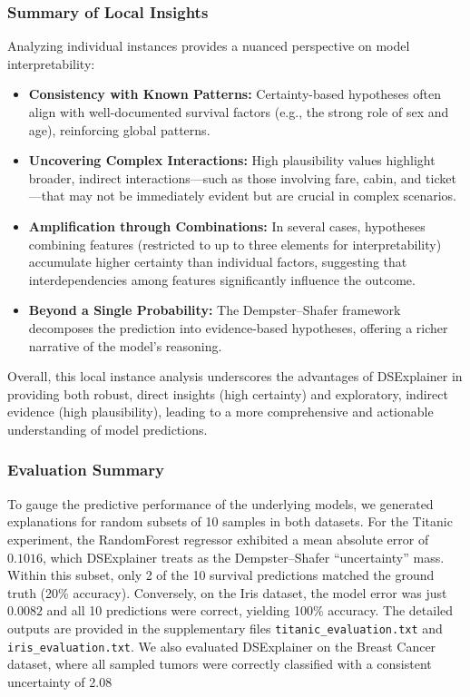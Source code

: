 \documentclass[acmlarge]{acmart}
\begin{document}
\subsubsection{Summary of Local Insights}

Analyzing individual instances provides a nuanced perspective on model interpretability:
\begin{itemize}
    \item \textbf{Consistency with Known Patterns:} Certainty-based hypotheses often align with well-documented survival factors (e.g., the strong role of sex and age), reinforcing global patterns.
    \item \textbf{Uncovering Complex Interactions:} High plausibility values highlight broader, indirect interactions—such as those involving fare, cabin, and ticket—that may not be immediately evident but are crucial in complex scenarios.
    \item \textbf{Amplification through Combinations:} In several cases, hypotheses combining features (restricted to up to three elements for interpretability) accumulate higher certainty than individual factors, suggesting that interdependencies among features significantly influence the outcome.
    \item \textbf{Beyond a Single Probability:} The Dempster–Shafer framework decomposes the prediction into evidence-based hypotheses, offering a richer narrative of the model’s reasoning.
\end{itemize}

Overall, this local instance analysis underscores the advantages of DSExplainer in providing both robust, direct insights (high certainty) and exploratory, indirect evidence (high plausibility), leading to a more comprehensive and actionable understanding of model predictions.
\subsubsection{Evaluation Summary}
\label{sec:validation}

To gauge the predictive performance of the underlying models, we generated explanations for random subsets of 10 samples in both datasets. For the Titanic experiment, the RandomForest regressor exhibited a mean absolute error of $0.1016$, which DSExplainer treats as the Dempster--Shafer ``uncertainty'' mass. Within this subset, only 2 of the 10 survival predictions matched the ground truth (20\% accuracy). Conversely, on the Iris dataset, the model error was just $0.0082$ and all 10 predictions were correct, yielding 100\% accuracy. The detailed outputs are provided in the supplementary files \texttt{titanic\_evaluation.txt} and \texttt{iris\_evaluation.txt}.
We also evaluated DSExplainer on the Breast Cancer dataset, where all sampled tumors were correctly classified with a consistent uncertainty of 2.08%
\end{document}
